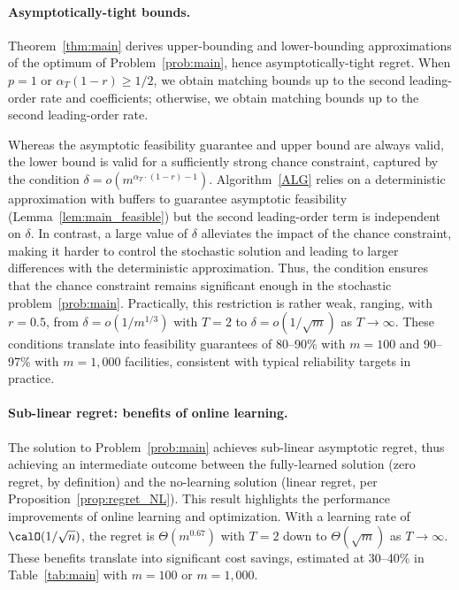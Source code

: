 \documentclass[blindrev]{informs3noheader}
\begin{document}
\paragraph{Asymptotically-tight bounds.}

Theorem~\ref{thm:main} derives upper-bounding and lower-bounding approximations of the optimum of Problem~\eqref{prob:main}, hence asymptotically-tight regret. When $p=1$ or $\alpha_T(1-r)\geq1/2$, we obtain matching bounds up to the second leading-order rate and coefficients; otherwise, we obtain matching bounds up to the second leading-order rate.

Whereas the asymptotic feasibility guarantee and upper bound are always valid, the lower bound is valid for a sufficiently strong chance constraint, captured by the condition $\delta = o\left(m^{\alpha_T\cdot(1-r)-1}\right)$. Algorithm~\ref{ALG} relies on a deterministic approximation with buffers to guarantee asymptotic feasibility (Lemma~\ref{lem:main_feasible}) but the second leading-order term is independent on $\delta$. In contrast, a large value of $\delta$ alleviates the impact of the chance constraint, making it harder to control the stochastic solution and leading to larger differences with the deterministic approximation. Thus, the condition ensures that the chance constraint remains significant enough in the stochastic problem~\eqref{prob:main}. Practically, this restriction is rather weak, ranging, with $r=0.5$, from $\delta=o\left(1/m^{1/3}\right)$ with $T=2$ to $\delta=o\left(1/\sqrt m\right)$ as $T\to\infty$. These conditions translate into feasibility guarantees of 80--90\% with $m=100$ and 90--97\% with $m=1,000$ facilities, consistent with typical reliability targets in practice.

\paragraph{Sub-linear regret: benefits of online learning.}

The solution to Problem~\eqref{prob:main} achieves sub-linear asymptotic regret, thus achieving an intermediate outcome between the fully-learned solution (zero regret, by definition) and the no-learning solution (linear regret, per Proposition~\ref{prop:regret_NL}). This result highlights the performance improvements of online learning and optimization. With a learning rate of $\calO(1/\sqrt n)$, the regret is $\Theta\left(m^{0.67}\right)$ with $T=2$ down to $\Theta\left(\sqrt m\right)$ as $T\to\infty$. These benefits translate into significant cost savings, estimated at 30--40\% in Table~\ref{tab:main} with $m=100$ or $m=1,000$.
\end{document}
